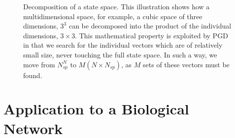 \documentclass{article}
\begin{document}
\begin{figure}[h]
\centering
{}
\caption{Decomposition of a state space. This illustration shows how a multidimensional space, for example, a cubic space of three dimensions, $3^3$ can be decomposed into the product of the individual dimensions, $3\times 3$. This mathematical property is exploited by PGD in that we search for the individual vectors which are of relatively small size, never touching the full state space. In such a way, we move from $N_{sp}^N$ to $M(N\times N_{sp})$, as $M$ sets of these vectors must be found.}
\label{cubes}
\end{figure}
\section{Application to a Biological Network}\label{bio_application}
\end{document}
